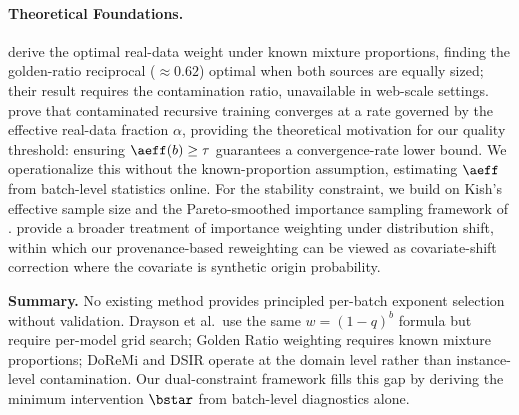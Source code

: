 \paragraph{Theoretical Foundations.}
\cite{he2025golden} derive the optimal real-data weight under known mixture proportions, finding the golden-ratio reciprocal (${\approx}0.62$) optimal when both sources are equally sized; their result requires the contamination ratio, unavailable in web-scale settings.
\cite{wang2026survive} prove that contaminated recursive training converges at a rate governed by the effective real-data fraction $\alpha$, providing the theoretical motivation for our quality threshold: ensuring $\aeff(b) \geq \tau$ guarantees a convergence-rate lower bound.
We operationalize this without the known-proportion assumption, estimating $\aeff$ from batch-level statistics online.
For the stability constraint, we build on Kish's effective sample size and the Pareto-smoothed importance sampling framework of \cite{vehtari2024psis}.
\cite{kimura2024iw} provide a broader treatment of importance weighting under distribution shift, within which our provenance-based reweighting can be viewed as covariate-shift correction where the covariate is synthetic origin probability.

\smallskip
\noindent\textbf{Summary.}
No existing method provides principled per-batch exponent selection without validation.
Drayson et al.\ use the same $w{=}(1{-}q)^b$ formula but require per-model grid search; Golden Ratio weighting requires known mixture proportions; DoReMi and DSIR operate at the domain level rather than instance-level contamination.
Our dual-constraint framework fills this gap by deriving the minimum intervention $\bstar$ from batch-level diagnostics alone.
